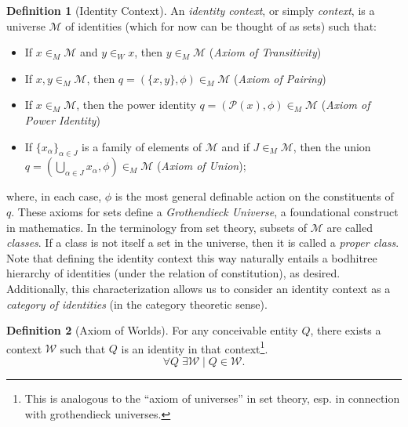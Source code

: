 \documentclass[pra,twocolumn,groupedaddress,10pt]{revtex4}
\theoremstyle{definition}
\newtheorem{defn}{Definition}[section]
\begin{document}
\begin{defn}[Identity Context]
	An \emph{identity context}, or simply \emph{context}, is a universe $\mathcal{M}$ of identities (which for now can be thought of as sets) such that:
	\begin{itemize}
		\item If $x \in_M \mathcal{M}$ and $y \in_W x$, then $y \in_M \mathcal{M}$ (\emph{Axiom of Transitivity})
		\item If $x, y \in_M \mathcal{M}$, then $q = (\{x,y\},\phi) \in_M \mathcal{M}$ (\emph{Axiom of Pairing})
		\item If $x \in_M \mathcal{M}$, then the power identity $q = (\mathscr{P}(x),\phi) \in_M \mathcal{M}$ (\emph{Axiom of Power Identity})
		\item If $\{x_{\alpha}\}_{\alpha \in J}$ is a family of elements of $\mathcal{M}$ and if $J \in_M \mathcal{M}$, then the union $q = (\bigcup_{\alpha \in J} x_{\alpha}, \phi) \in_M \mathcal{M}$ (\emph{Axiom of Union});
	\end{itemize}
	where, in each case, $\phi$ is the most general definable action on the constituents of $q$. These axioms for sets define a \emph{Grothendieck Universe}\cite{grothendieck}\cite{foundcat}, a foundational construct in mathematics. In the terminology from set theory, subsets of $\mathcal{M}$ are called \emph{classes}. If a class is not itself a set in the universe, then it is called a \emph{proper class}.
	Note that defining the identity context this way naturally entails a bodhitree hierarchy of identities (under the relation of constitution), as desired. Additionally, this characterization allows us to consider an identity context as a \emph{category of identities} (in the category theoretic sense).
\end{defn}

\begin{defn}[Axiom of Worlds]
	For any conceivable entity $Q$, there exists a context $\mathcal{W}$ such that $Q$ is an identity in that context\footnote{This is analogous to the ``axiom of universes''\cite{maclane} in set theory, esp. in connection with grothendieck universes.}.
	\begin{equation}
		\forall Q \; \exists \mathcal{W} \mid Q \in \mathcal{W}. \nonumber
	\end{equation}
\end{defn}
\end{document}
